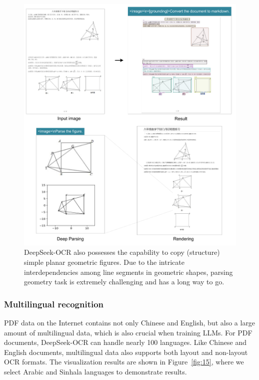 \documentclass[11pt, a4paper, logo, copyright, nonumbering]{deepseek}
\begin{document}
\begin{CJK*}{UTF8}{gbsn}
\begin{figure}[!h]
	\centering
    \includegraphics[width=1.0\linewidth]{figures/7.pdf}
	\caption{DeepSeek-OCR also possesses the capability to copy (structure) simple planar geometric figures. Due to the intricate interdependencies among line segments in geometric shapes, parsing geometry task is extremely challenging and has a long way to go.}
	\label{fig:14}
\end{figure}

\subsubsection{Multilingual recognition}

PDF data on the Internet contains not only Chinese and English, but also a large amount of multilingual data, which is also crucial when training LLMs. For PDF documents, DeepSeek-OCR can handle nearly 100 languages. Like Chinese and English documents, multilingual data also supports both layout and non-layout OCR formats. The visualization results are shown in Figure~\ref{fig:15}, where we select Arabic and Sinhala languages to demonstrate results.




\end{CJK*}
\end{document}
